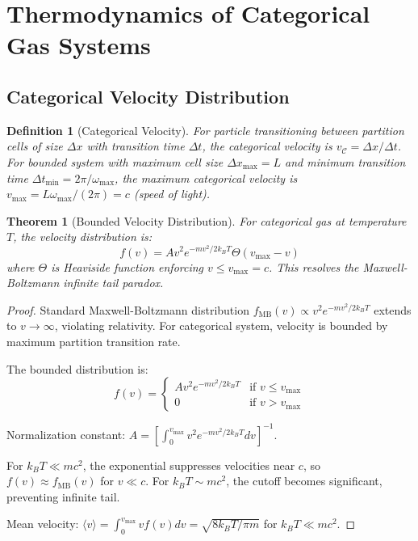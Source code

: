 \documentclass[twocolumn,10pt]{article}
\newtheorem{theorem}{Theorem}[section]
\newtheorem{definition}{Definition}[section]
\begin{document}
\section{Thermodynamics of Categorical Gas Systems}

\subsection{Categorical Velocity Distribution}

\begin{definition}[Categorical Velocity]
For particle transitioning between partition cells of size $\Delta x$ with transition time $\Delta t$, the categorical velocity is $v_{\mathcal{C}} = \Delta x/\Delta t$. For bounded system with maximum cell size $\Delta x_{\max} = L$ and minimum transition time $\Delta t_{\min} = 2\pi/\omega_{\max}$, the maximum categorical velocity is $v_{\max} = L\omega_{\max}/(2\pi) = c$ (speed of light).
\end{definition}

\begin{theorem}[Bounded Velocity Distribution]
\label{thm:bounded_velocity}
For categorical gas at temperature $T$, the velocity distribution is:
\begin{equation}
f(v) = A v^2 e^{-mv^2/2k_BT} \Theta(v_{\max} - v)
\end{equation}
where $\Theta$ is Heaviside function enforcing $v \leq v_{\max} = c$. This resolves the Maxwell-Boltzmann infinite tail paradox.
\end{theorem}

\begin{proof}
Standard Maxwell-Boltzmann distribution $f_{\text{MB}}(v) \propto v^2 e^{-mv^2/2k_BT}$ extends to $v \to \infty$, violating relativity. For categorical system, velocity is bounded by maximum partition transition rate.

The bounded distribution is:
\begin{equation}
f(v) = \begin{cases}
A v^2 e^{-mv^2/2k_BT} & \text{if } v \leq v_{\max} \\
0 & \text{if } v > v_{\max}
\end{cases}
\end{equation}

Normalization constant: $A = \left[\int_0^{v_{\max}} v^2 e^{-mv^2/2k_BT} dv\right]^{-1}$.

For $k_BT \ll mc^2$, the exponential suppresses velocities near $c$, so $f(v) \approx f_{\text{MB}}(v)$ for $v \ll c$. For $k_BT \sim mc^2$, the cutoff becomes significant, preventing infinite tail.

Mean velocity: $\langle v \rangle = \int_0^{v_{\max}} v f(v) dv = \sqrt{8k_BT/\pi m}$ for $k_BT \ll mc^2$.
\end{proof}
\end{document}
